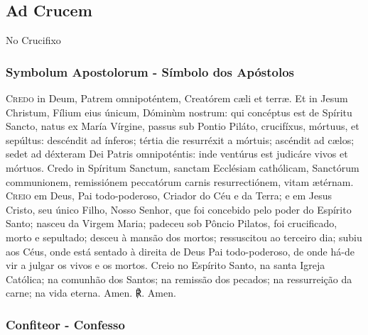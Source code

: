 \emph{}

\subsection{Ad Crucem}
\begin{nscenter}No Crucifixo\end{nscenter}
\subsubsection{Symbolum Apostolorum - Símbolo dos Apóstolos}
\begin{paracol}{2}
\lettrine[lines=4,loversize=-.15,lraise=.15]{{\bg C}}{\redx redo} in Deum, Patrem omnipoténtem, Creatórem cæli et terræ. Et in Jesum Christum, Fílium eius únicum, Dóminùm nostrum: qui concéptus est de Spíritu Sancto, natus ex María Vírgine, passus sub Pontio Piláto, crucifíxus, mórtuus, et sepúltus: descéndit ad ínferos; tértia die resurréxit a mórtuis; ascéndit ad cælos; sedet ad déxteram Dei Patris omnipoténtis: inde ventúrus est judicáre vivos et mórtuos. Credo in Spíritum Sanctum, sanctam Ecclésiam cathólicam, Sanctórum communionem, remissiónem peccatórum carnis resurrectiónem, vitam ætérnam.
\switchcolumn
\lettrine[lines=4,loversize=-.15,lraise=.15]{{\bg C}}{\redx reio} em Deus, Pai todo-poderoso, Criador do Céu e da Terra; e em Jesus Cristo, seu único Filho, Nosso Senhor, que foi concebido pelo poder do Espírito Santo; nasceu da Virgem Maria; padeceu sob Pôncio Pilatos, foi crucificado, morto e sepultado; desceu à mansão dos mortos; ressuscitou ao terceiro dia; subiu aos Céus, onde está sentado à direita de Deus Pai todo-poderoso, de onde há-de vir a julgar os vivos e os mortos. Creio no Espírito Santo, na santa Igreja Católica; na comunhão dos Santos; na remissão dos pecados; na ressurreição da carne; na vida eterna.
 Amen.
\switchcolumn
{\redx ℟.} Amen.
\end{paracol}

\pagebreak [3]

\subsubsection{Confiteor - Confesso}

\emph{}

